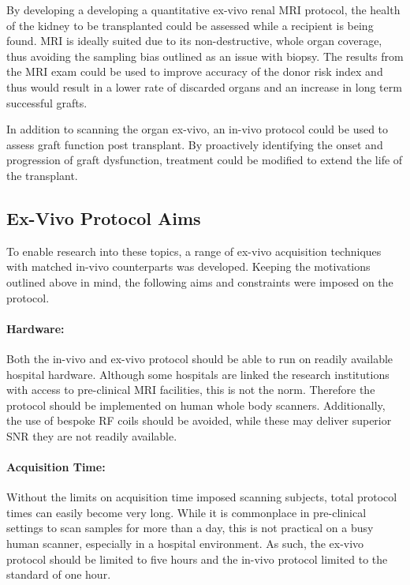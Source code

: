 By developing a developing a quantitative ex-vivo renal \ac{MRI} protocol, the health of the kidney to be transplanted could be assessed while a recipient is being found. \ac{MRI} is ideally suited due to its non-destructive, whole organ coverage, thus avoiding the sampling bias outlined as an issue with biopsy. The results from the \ac{MRI} exam could be used to improve accuracy of the donor risk index and thus would result in a lower rate of discarded organs and an increase in long term successful grafts. 

In addition to scanning the organ ex-vivo, an in-vivo protocol could be used to assess graft function post transplant. By proactively identifying the onset and progression of graft dysfunction, treatment could be modified to extend the life of the transplant.


\subsection{Ex-Vivo Protocol Aims}

To enable research into these topics, a range of ex-vivo acquisition techniques with matched in-vivo counterparts was developed. Keeping the motivations outlined above in mind, the following aims and constraints were imposed on the protocol.

\paragraph{Hardware:} Both the in-vivo and ex-vivo protocol should be able to run on readily available hospital hardware. Although some hospitals are linked the research institutions with access to pre-clinical \ac{MRI} facilities, this is not the norm. Therefore the protocol should be implemented on human whole body scanners. Additionally, the use of bespoke \ac{RF} coils should be avoided, while these may deliver superior \ac{SNR} they are not readily available.

\paragraph{Acquisition Time:} Without the limits on acquisition time imposed scanning subjects, total protocol times can easily become very long. While it is commonplace in pre-clinical settings to scan samples for more than a day, this is not practical on a busy human scanner, especially in a hospital environment. As such, the ex-vivo protocol should be limited to five hours and the in-vivo protocol limited to the standard of one hour.


